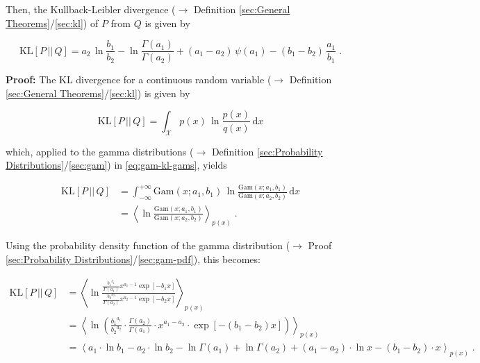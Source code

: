 \documentclass[a4paper,12pt,twoside]{book}
\begin{document}
Then, the Kullback-Leibler divergence ($\rightarrow$ Definition \ref{sec:General Theorems}/\ref{sec:kl}) of $P$ from $Q$ is given by

\begin{equation} \label{eq:gam-kl-gam-KL}
\mathrm{KL}[P\,||\,Q] = a_2 \, \ln \frac{b_1}{b_2} - \ln \frac{\Gamma(a_1)}{\Gamma(a_2)} + (a_1 - a_2) \, \psi(a_1) - (b_1 - b_2) \, \frac{a_1}{b_1} \; .
\end{equation}


\vspace{1em}
\textbf{Proof:} The KL divergence for a continuous random variable ($\rightarrow$ Definition \ref{sec:General Theorems}/\ref{sec:kl}) is given by 

\begin{equation} \label{eq:gam-kl-KL-cont}
\mathrm{KL}[P\,||\,Q] = \int_{\mathcal{X}} p(x) \, \ln \frac{p(x)}{q(x)} \, \mathrm{d}x
\end{equation}

which, applied to the gamma distributions ($\rightarrow$ Definition \ref{sec:Probability Distributions}/\ref{sec:gam}) in \eqref{eq:gam-kl-gams}, yields

\begin{equation} \label{eq:gam-kl-gam-KL-s1}
\begin{split}
\mathrm{KL}[P\,||\,Q] &= \int_{-\infty}^{+\infty} \mathrm{Gam}(x; a_1, b_1) \, \ln \frac{\mathrm{Gam}(x; a_1, b_1)}{\mathrm{Gam}(x; a_2, b_2)} \, \mathrm{d}x \\
&= \left\langle \ln \frac{\mathrm{Gam}(x; a_1, b_1)}{\mathrm{Gam}(x; a_2, b_2)} \right\rangle_{p(x)} \; .
\end{split}
\end{equation}

Using the probability density function of the gamma distribution ($\rightarrow$ Proof \ref{sec:Probability Distributions}/\ref{sec:gam-pdf}), this becomes:

\begin{equation} \label{eq:gam-kl-gam-KL-s2}
\begin{split}
\mathrm{KL}[P\,||\,Q] &= \left\langle \ln \frac{ \frac{ {b_1}^{a_1}}{\Gamma(a_1)} x^{a_1-1} \exp[-b_1 x] }{ \frac{ {b_2}^{a_2}}{\Gamma(a_2)} x^{a_2-1} \exp[-b_2 x] } \right\rangle_{p(x)} \\
&= \left\langle \ln \left( \frac{ {b_1}^{a_1}}{ {b_2}^{a_2}} \cdot \frac{\Gamma(a_2)}{\Gamma(a_1)} \cdot x^{a_1-a_2} \cdot \exp[-(b_1-b_2) x] \right) \right\rangle_{p(x)} \\
&= \left\langle a_1 \cdot \ln b_1 - a_2 \cdot \ln b_2 - \ln \Gamma(a_1) + \ln \Gamma(a_2) + (a_1-a_2) \cdot \ln x - (b_1-b_2) \cdot x \right\rangle_{p(x)} \; .
\end{split}
\end{equation}
\end{document}
